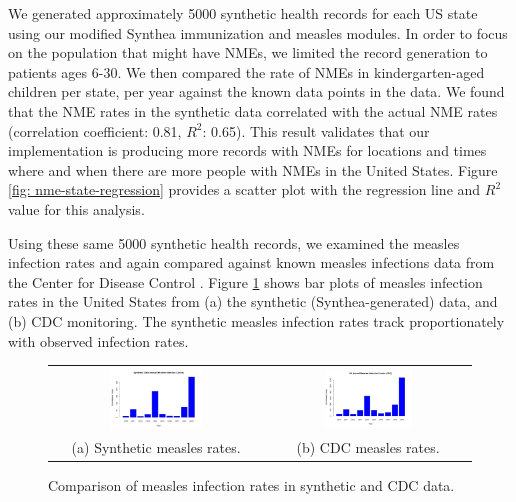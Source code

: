 \documentclass[12pt]{article}
\begin{document}
We generated approximately 5000 synthetic health records for each US state using our modified Synthea immunization and measles modules.  In order to focus on the population that might have NMEs, we limited the record generation to patients ages 6-30.  We then compared the rate of NMEs in kindergarten-aged children per state, per year against the known data points in the \citet{vaccine-exemptions-cdc} data.  We found that the NME rates in the synthetic data correlated with the actual NME rates (correlation coefficient: 0.81, $R^{2}$: 0.65).  This result validates that our implementation is producing more records with NMEs for locations and times where and when there are more people with NMEs in the United States.  Figure \ref{fig: nme-state-regression} provides a scatter plot with the regression line and $R^{2}$ value for this analysis. 

Using these same 5000 synthetic health records, we examined the measles infection rates and again compared against known measles infections data from the Center for Disease Control \cite{measles-cases-cdc}.  Figure \ref{fig: measles-cases-comparison} shows bar plots of measles infection rates in the United States from (a) the synthetic (Synthea-generated) data, and (b) CDC monitoring.  The synthetic measles infection rates track proportionately with observed infection rates.   

\begin{figure}[!hbt]\centering
    \begin{tabular}{cc}
    \includegraphics[width=0.45\textwidth]{figures/measles-annual-counts.png} &
    \includegraphics[width=0.45\textwidth]{figures/cdc-measles-annual-counts.png} \\
    (a) Synthetic measles rates. & (b) CDC measles rates.
    \end{tabular}
    \caption{Comparison of measles infection rates in synthetic and CDC data.\label{fig: measles-cases-comparison}}
\end{figure}
\end{document}
